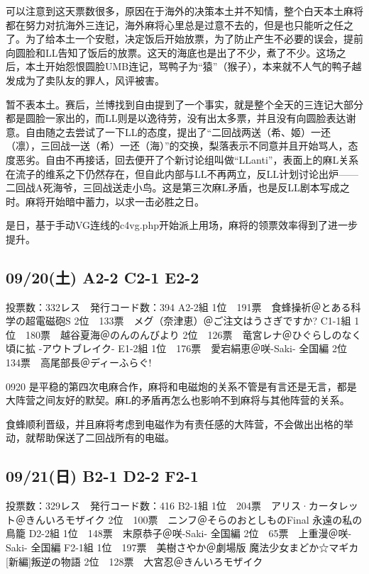 可以注意到这天票数很多，原因在于海外的决策本土并不知情，整个白天本土麻将都在努力对抗海外三连记，海外麻将心里总是过意不去的，但是也只能听之任之了。为了给本土一个安慰，决定饭后开始放票，为了防止产生不必要的误会，提前向圆脸和LL告知了饭后的放票。这天的海底也是出了不少，煮了不少。这场之后，本土开始怨恨圆脸UMB连记，骂鸭子为“猿”（猴子），本来就不人气的鸭子越发成为了卖队友的罪人，风评被害。

暂不表本土。赛后，兰博找到自由提到了一个事实，就是整个全天的三连记大部分都是圆脸一家出的，而LL则是以逸待劳，没有出太多票，并且没有向圆脸表达谢意。自由随之去尝试了一下LL的态度，提出了“二回战两送（希、姬）一还（凛），三回战一送（希）一还（海）”的交换，梨落表示不同意并且开始骂人，态度恶劣。自由不再接话，回去便开了个新讨论组叫做“LLanti”，表面上的麻L关系在流子的维系之下仍然存在，但自此内部与LL不再两立，反LL计划讨论出炉——二回战A死海爷，三回战送走小鸟。这是第三次麻L矛盾，也是反LL剧本写成之时。麻将开始暗中蓄力，以求一击必胜之日。

是日，基于手动VG连线的c4vg.php开始派上用场，麻将的领票效率得到了进一步提升。

\subsection{09/20(土) A2-2 C2-1 E2-2}

    投票数：332レス　発行コード数：394
    A2-2組
    1位　191票　食蜂操祈＠とある科学の超電磁砲S
    2位　133票　メグ（奈津恵）＠ご注文はうさぎですか?
    C1-1組
    1位　180票　越谷夏海＠のんのんびより
    2位　126票　竜宮レナ＠ひぐらしのなく頃に拡 -アウトブレイク-
    E1-2組
    1位　176票　愛宕絹恵＠咲-Saki- 全国編
    2位　134票　高尾部長＠ディーふらぐ!

0920 是平稳的第四次电麻合作，麻将和电磁炮的关系不管是有言还是无言，都是大阵营之间友好的默契。麻L的矛盾再怎么也影响不到麻将与其他阵营的关系。

食蜂顺利晋级，并且麻将考虑到电磁作为有责任感的大阵营，不会做出出格的举动，就帮助保送了二回战所有的电磁。

\subsection{09/21(日) B2-1 D2-2 F2-1}

    投票数：329レス　発行コード数：416
    B2-1組
    1位　204票　アリス·カータレット＠きんいろモザイク
    2位　100票　ニンフ＠そらのおとしものFinal 永遠の私の鳥籠
    D2-2組
    1位　148票　末原恭子＠咲-Saki- 全国編
    2位　65票　上重漫＠咲-Saki- 全国編
    F2-1組
    1位　197票　美樹さやか＠劇場版 魔法少女まどか☆マギカ[新編]叛逆の物語
    2位　128票　大宮忍＠きんいろモザイク

